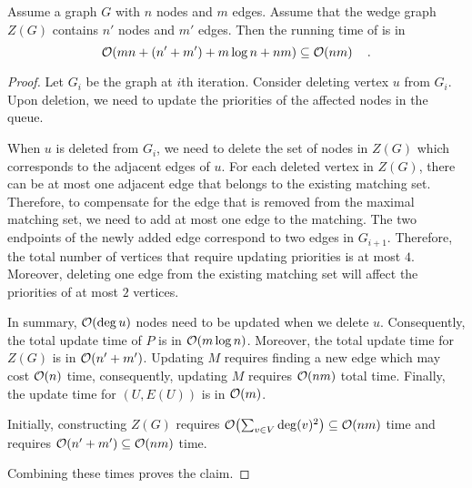 \begin{proposition}
Assume a graph $G$ with $n$ nodes and  $m$ edges. Assume that the wedge graph $Z(G)$ contains $n'$ nodes and $m'$ edges.
Then the running time of \alggreedyfastest is in
\[
\bigO{ mn  + (n' + m') + m \log n + nm} \subseteq \bigO{nm} \quad.
\]
\label{prop:greedy}
\end{proposition}
\begin{proof}
Let $G_i$ be the graph at $i$th iteration. Consider deleting vertex $u$ from $G_i$.
Upon deletion, we need to update the priorities of the affected nodes in the queue.

When $u$ is deleted from $G_i$, we need to delete the set of nodes in $Z(G)$ which corresponds to the adjacent edges of $u$. 
For each deleted vertex in $Z(G)$, there can be at most one adjacent edge that belongs to the existing matching set.
Therefore, to compensate for the edge that is removed from the maximal matching set, we need to add at most one edge to the matching.
The two endpoints of the newly added edge correspond to two edges in $G_{i+1}$.
Therefore, the total number of vertices that require updating priorities is at most $4$. 
Moreover, deleting one edge from the existing matching set will affect the priorities of at most $2$ vertices.

In summary, $\bigO{\deg u}$ nodes need to be updated when we delete $u$. Consequently, the total update time of $P$ is in $\bigO{m \log n}$.
Moreover, the total update time for $Z(G)$ is in $\bigO{n' + m'}$. Updating $M$ requires finding a new edge which may cost $\bigO{n}$ time, consequently, updating $M$ requires $\bigO{nm}$ total time. Finally, the update time for $(U, E(U))$ is in $\bigO{m}$.

Initially, constructing $Z(G)$ requires  $\bigO{\sum_{v \in V} \deg(v)^2} \subseteq \bigO{nm}$ time and \algvcm requires $\bigO{n' + m'} \subseteq \bigO{nm}$ time.

Combining these times proves the claim.
\end{proof}


